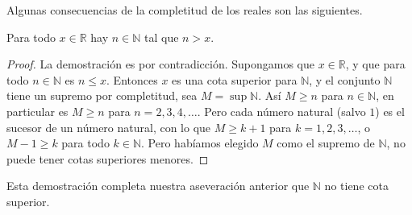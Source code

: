   Algunas consecuencias de la completitud de los reales son las siguientes.
  \begin{theorem}
    \label{theo:arquimedeana}
    Para todo \(x \in \mathbb{R}\)
    hay \(n \in \mathbb{N}\)
    tal que \(n > x\).
  \end{theorem}
  \begin{proof}
    La demostración es por contradicción.
    Supongamos que \(x \in \mathbb{R}\),
    y que para todo \(n \in \mathbb{N}\) es \(n \le x\).
    Entonces \(x\) es una cota superior para \(\mathbb{N}\),
    y el conjunto \(\mathbb{N}\) tiene un supremo por completitud,
    sea \(M = \sup \mathbb{N}\).
    Así \(M \ge n\) para \(n \in \mathbb{N}\),
    en particular es \(M \ge n\) para \(n = 2, 3, 4, \dotsc\).
    Pero cada número natural
    (salvo \(1\))
    es el sucesor de un número natural,
    con lo que \(M \ge k + 1\) para \(k = 1, 2, 3, \dotsc\),
    o \(M - 1 \ge k\) para todo \(k \in \mathbb{N}\).
    Pero habíamos elegido \(M\) como el supremo de \(\mathbb{N}\),
    no puede tener cotas superiores menores.
  \end{proof}
  Esta demostración completa nuestra aseveración anterior que \(\mathbb{N}\)
  no tiene cota superior.

